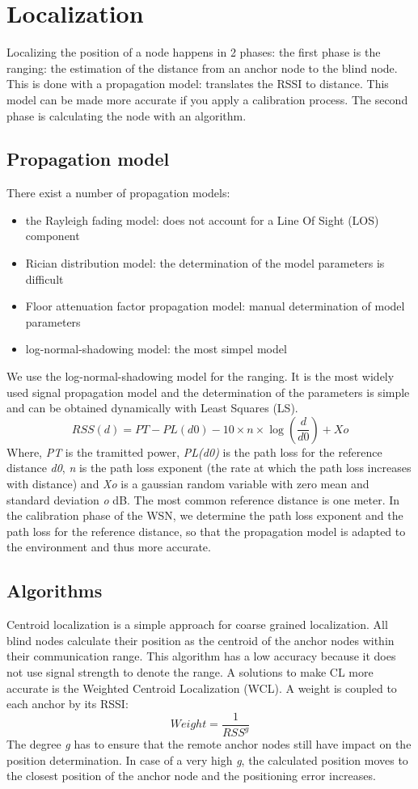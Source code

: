 \section{Localization}
Localizing the position of a node happens in 2 phases:
the first phase is the ranging: the estimation of the distance from an anchor node to the blind node. This is done with a propagation model: translates the RSSI to distance. This model can be made more accurate if you apply a calibration process.
The second phase is calculating the node with an algorithm.

\subsection{Propagation model}
There exist a number of propagation models:
\begin{itemize}
	\item the Rayleigh fading model\cite{hashemi1993irp}: does not account for a Line Of Sight (LOS) component
	\item Rician distribution model\cite{rice1944mar}: the determination of the model parameters is difficult
	\item Floor attenuation factor propagation model\cite{seidel1992mpl}: manual determination of model parameters
	\item log-normal-shadowing model\cite{seidel1992mpl}: the most simpel model
\end{itemize}
We use the log-normal-shadowing model for the ranging. It is the most widely used signal propagation model and the determination of the parameters is simple and can be obtained dynamically with Least Squares (LS).
\[
RSS(d) = PT - PL(d0) - 10\times n \times \log( \frac{d}{d0} )+ Xo
\]
Where, \textsl{PT}	is the tramitted power, \textsl{PL(d0)} is the path loss for the reference distance \textsl{d0}, \textsl{n} is the path loss exponent (the rate at which the path loss increases with distance) and \textsl{Xo} is a gaussian random variable with zero mean and standard deviation \textsl{o} dB.
The most common reference distance is one meter. In the calibration phase of the WSN, we determine the path loss exponent and the path loss for the reference distance, so that the propagation model is adapted to the environment and thus more accurate.

\subsection{Algorithms}
Centroid localization is a simple approach for coarse grained localization. All blind nodes calculate their position as the centroid of the anchor nodes within their communication range. This algorithm has a low accuracy because it does not use signal strength to denote the range. A solutions to make CL more accurate is the Weighted Centroid Localization (WCL)\cite{schuhmann2008iwc}. A weight is coupled to each anchor by its RSSI:
\[
Weight = \frac{1}{RSS^{g}}
\]
The degree \textsl{g} has to ensure that the remote anchor nodes still have impact on the position determination. In case of a very high \textsl{g}, the calculated position
moves to the closest position of the anchor node and the positioning error increases.

